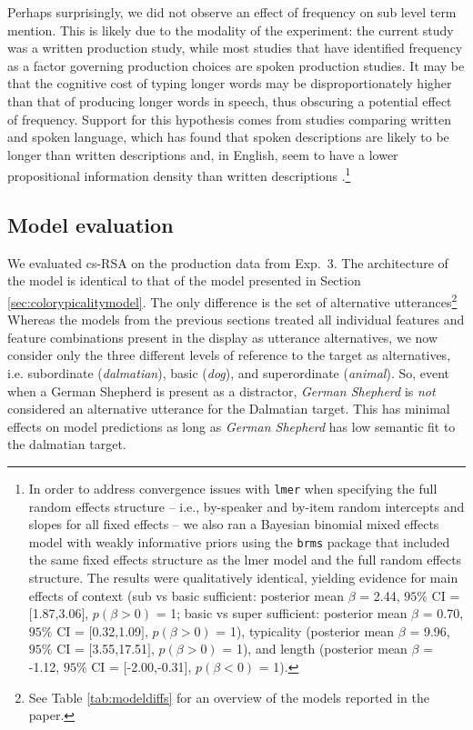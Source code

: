 \documentclass[11pt]{article}
\newcommand{\tableref}[1]{Table \ref{#1}}
\newcommand{\sectionref}[1]{Section \ref{#1}}
\begin{document}
Perhaps surprisingly, we did not observe an effect of frequency on sub level term mention. This is likely due to the modality of the experiment: the current study was a written production study, while most studies that have identified frequency as a factor governing production choices are spoken production studies. It may be that the cognitive cost of typing longer words may be disproportionately higher than that of producing longer words in speech, thus obscuring a potential effect of frequency. Support for this hypothesis comes from studies comparing written and spoken language, which has found that spoken descriptions are likely to be longer than written descriptions and, in English, seem to have a lower propositional information density than written descriptions \cite{VanMiltenburg2018}.\footnote{In order to address convergence issues with \verb+lmer+ when specifying the full random effects structure -- i.e., by-speaker and by-item random intercepts and slopes for all fixed effects -- we also ran a Bayesian binomial mixed effects model with weakly informative priors using the \verb+brms+ package \cite{brms} that included the same fixed effects structure as the lmer model and the full random effects structure. The results were qualitatively identical, yielding  evidence for main effects of context (sub vs basic sufficient: posterior mean $\beta$ = 2.44, $95\%$ CI = $[$1.87,3.06$]$, $p(\beta > 0)$ = 1; basic vs super sufficient: posterior mean $\beta$ = 0.70, $95\%$ CI = $[$0.32,1.09$]$, $p(\beta > 0)$ = 1), typicality (posterior mean $\beta$ = 9.96, $95\%$ CI = $[$3.55,17.51$]$, $p(\beta > 0)$ = 1), and length (posterior mean $\beta$ = -1.12, $95\%$ CI = $[$-2.00,-0.31$]$, $p(\beta < 0)$ = 1).} 



\subsection{Model evaluation}
\label{sec:reflevelmodel}


We evaluated cs-RSA on the production data from Exp.~3. The architecture of the model is identical to that of the model presented in \sectionref{sec:colorypicalitymodel}. The only difference is the set of alternative utterances\footnote{See \tableref{tab:modeldiffs} for an overview of the models reported in the paper.} Whereas the models from the previous sections treated all individual features and feature combinations present in the display as utterance alternatives, we now consider only the three different levels of reference to the target as alternatives, i.e. subordinate (\emph{dalmatian}), basic (\emph{dog}), and superordinate (\emph{animal}). So, event when a German Shepherd is present as a distractor, \emph{German Shepherd} is \emph{not} considered an alternative utterance for the Dalmatian target. This has minimal effects on model predictions as long as \emph{German Shepherd} has low semantic fit to the dalmatian target. 
\end{document}
